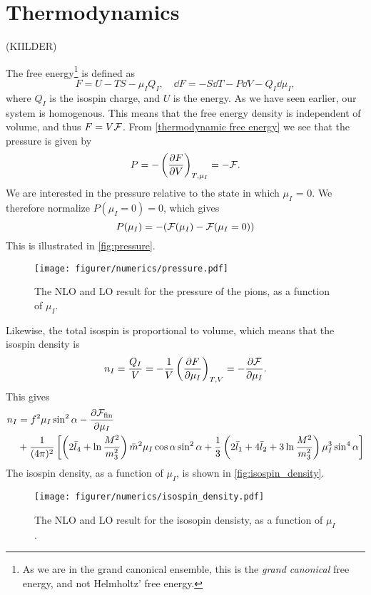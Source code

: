 \section{Thermodynamics}
(KIILDER)

The free energy\footnote{As we are in the grand canonical ensemble, this is the \emph{grand canonical} free energy, and not Helmholtz' free energy.}
is defined as
\begin{equation}
    \label{thermodynamic free energy}
    F = U - TS - \mu_I Q_I, \quad \dd F = - S \dd T - P \dd V - Q_I \dd \mu_I ,
\end{equation}
where $Q_I$ is the isospin charge, and $U$ is the energy.
As we have seen earlier, our system is homogenous.
This means that the free energy density is independent of volume, and thus $F = V \mathcal{F}$.
From  \cref{thermodynamic free energy} we see that the pressure is given by
\begin{equation}
    P = - \left(\diffp{F}{V}\right)_{T, \mu_I} = - \Ef.
\end{equation}
We are interested in the pressure relative to the state in which $\mu_I$ = 0. We therefore normalize $P(\mu_I=0) = 0$, which gives  
\begin{equation}
    P(\mu_I) = -(\mathcal{F}(\mu_I) - \mathcal{F}(\mu_I = 0))
\end{equation}
This is illustrated in \autoref{fig:pressure}.
\begin{figure}[h]
    \centering
    \vspace{-0.2cm}
    \texttt{[image: figurer/numerics/pressure.pdf]}
    \caption{The NLO and LO result for the pressure of the pions, as a function of $\mu_I$.}
    \label{fig:pressure}
\end{figure}

Likewise, the total isospin is proportional to volume, which means that the isospin density is
\begin{equation}
    n_I = \frac{Q_I}{V} = - \frac{1}{V} \left(\diffp{F}{\mu_I}\right)_{T, V}
    = - \diffp{\Ef}{\mu_I}.
\end{equation}
This gives 
\begin{align}
    \nonumber
    n_I & = 
    f^2 \mu_I \sin^2 \alpha
    - \diffp{\Ef_\mathrm{fin}}{\mu_I} \\
    & + \frac{1}{(4 \pi)^2}
    \left[
            \left(2\bar l_4+\ln\frac{M^2}{m_3^2}\right)\bar m^2 \mu_I \cos\alpha \sin^2 \alpha
            +\frac{1}{3}\left(2\bar l_1 + 4 \bar l_2 + 3\ln\frac{M^2}{m_3^2}\right)\mu_I^3 \sin^4 \alpha
    \right]
\end{align}
The isospin density, as a function of $\mu_I$, is shown in \autoref{fig:isospin_density}.
\begin{figure}[!h]
    \centering
    \vspace{-0.2cm}
    \texttt{[image: figurer/numerics/isospin\_density.pdf]}
    \caption{The NLO and LO result for the isosopin densisty, as a function of $\mu_I$.}
    \label{fig:isospin_density}
\end{figure}

